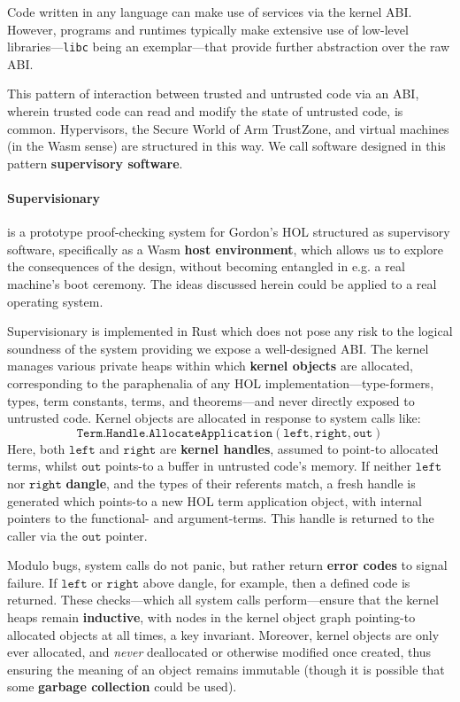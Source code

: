 \documentclass[sigplan, review]{acmart}
\newcommand{\deffont}[1]{\textbf{#1}}
\begin{document}
Code written in any language can make use of services via the kernel ABI.
However, programs and runtimes typically make extensive use of low-level libraries---\texttt{libc} being an exemplar---that provide further abstraction over the raw ABI.

This pattern of interaction between trusted and untrusted code via an ABI, wherein trusted code can read and modify the state of untrusted code, is common.
Hypervisors, the Secure World of Arm TrustZone, and virtual machines (in the Wasm sense) are structured in this way.
We call software designed in this pattern \deffont{supervisory software}.

\paragraph{Supervisionary} is a prototype proof-checking system for Gordon's HOL structured as supervisory software, specifically as a Wasm \deffont{host environment}, which allows us to explore the consequences of the design, without becoming entangled in e.g. a real machine's boot ceremony.
The ideas discussed herein could be applied to a real operating system.

Supervisionary is implemented in Rust which does not pose any risk to the logical soundness of the system providing we expose a well-designed ABI.
The kernel manages various private heaps within which \deffont{kernel objects} are allocated, corresponding to the paraphenalia of any HOL implementation---type-formers, types, term constants, terms, and theorems---and never directly exposed to untrusted code.
Kernel objects are allocated in response to system calls like:
\begin{displaymath}
\mathtt{Term.Handle.AllocateApplication(left, right, out)}
\end{displaymath}
Here, both $\mathtt{left}$ and $\mathtt{right}$ are \deffont{kernel handles}, assumed to point-to allocated terms, whilst $\mathtt{out}$ points-to a buffer in untrusted code's memory.
If neither $\mathtt{left}$ nor $\mathtt{right}$ \deffont{dangle}, and the types of their referents match, a fresh handle is generated which points-to a new HOL term application object, with internal pointers to the functional- and argument-terms.
This handle is returned to the caller via the $\mathtt{out}$ pointer.

Modulo bugs, system calls do not panic, but rather return \deffont{error codes} to signal failure.
If $\mathtt{left}$ or $\mathtt{right}$ above dangle, for example, then a defined code is returned.
These checks---which all system calls perform---ensure that the kernel heaps remain \deffont{inductive}, with nodes in the kernel object graph pointing-to allocated objects at all times, a key invariant.
Moreover, kernel objects are only ever allocated, and \emph{never} deallocated or otherwise modified once created, thus ensuring the meaning of an object remains immutable (though it is possible that some \deffont{garbage collection} could be used).
\end{document}
